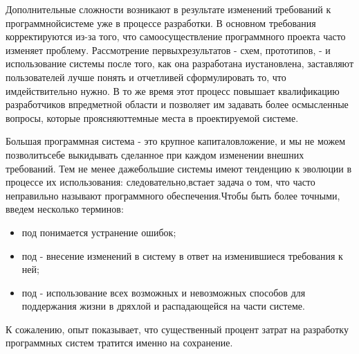 \documentclass[10pt]{article}
\begin{document}
Дополнительные сложности возникают в результате изменений требований к программной\linebreak  системе уже в процессе разработки. В основном требования корректируются из-за того, что само\linebreak  осуществление программного проекта часто изменяет проблему. Рассмотрение первых\linebreak  результатов - схем, прототипов, - и использование системы после того, как она разработана и\linebreak  установлена, заставляют пользователей лучше понять и отчетливей сформулировать то, что им\linebreak  действительно нужно. В то же время этот процесс повышает квалификацию разработчиков в\linebreak  предметной области и позволяет им задавать более осмысленные вопросы, которые проясняют\linebreak  темные места в проектируемой системе. \vspace{3mm}

Большая программная система - это крупное капиталовложение, и мы не можем позволить\linebreak  себе выкидывать сделанное при каждом изменении внешних требований. Тем не менее даже\linebreak  большие системы имеют тенденцию к эволюции в процессе их использования: следовательно,\linebreak  встает задача о том, что часто неправильно называют { программного обеспечения}.\linebreak  Чтобы быть более точными, введем несколько терминов: 
\begin{itemize}
\item \hspace{0.5cm} под {} понимается устранение ошибок;
\item \hspace{0.5cm} под {} - внесение изменений в систему в ответ на изменившиеся требования к ней;
\item \hspace{0.5cm} под {} - использование всех возможных и невозможных способов для поддержания жизни в дряхлой и распадающейся на части системе.
\end{itemize}

К сожалению, опыт показывает, что существенный процент затрат на разработку программных систем тратится именно на сохранение. \vspace{3mm}
\end{document}
